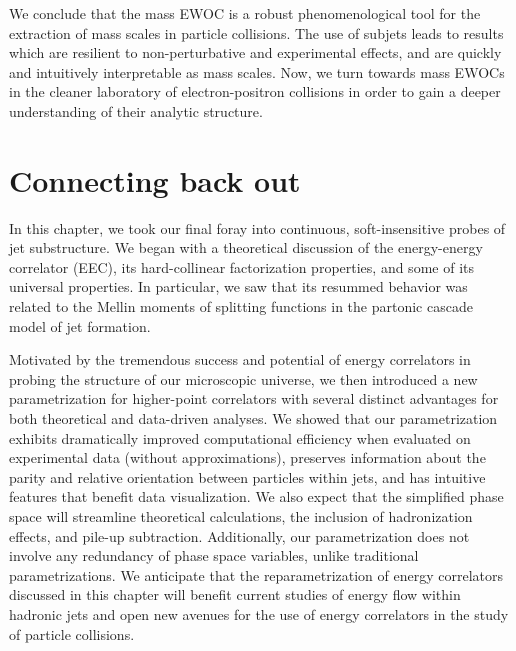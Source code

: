 We conclude that the mass EWOC is a robust phenomenological tool for the extraction of mass scales in particle collisions.
%
The use of subjets leads to results which are resilient to non-perturbative and experimental effects, and are quickly and intuitively interpretable as mass scales.
%
Now, we turn towards mass EWOCs in the cleaner laboratory of electron-positron collisions in order to gain a deeper understanding of their analytic structure.




\section{Connecting back out}


In this chapter, we took our final foray into continuous, soft-insensitive probes of jet substructure.
%
We began with a theoretical discussion of the energy-energy correlator (EEC), its hard-collinear factorization properties, and some of its universal properties.
%
In particular, we saw that its resummed behavior was related to the Mellin moments of splitting functions in the partonic cascade model of jet formation.

Motivated by the tremendous success and potential of energy correlators in probing the structure of our microscopic universe, we then introduced a new parametrization for higher-point correlators with several distinct advantages for both theoretical and data-driven analyses.
%
We showed that our parametrization exhibits dramatically improved computational efficiency when evaluated on experimental data (without approximations), preserves information about the parity and relative orientation between particles within jets, and has intuitive features that benefit data visualization.
%
We also expect that the simplified phase space will streamline theoretical calculations, the inclusion of hadronization effects, and pile-up subtraction.
%
Additionally, our parametrization does not involve any redundancy of phase space variables, unlike traditional parametrizations.
%
We anticipate that the reparametrization of energy correlators discussed in this chapter will benefit current studies of energy flow within hadronic jets and open new avenues for the use of energy correlators in the study of particle collisions.



